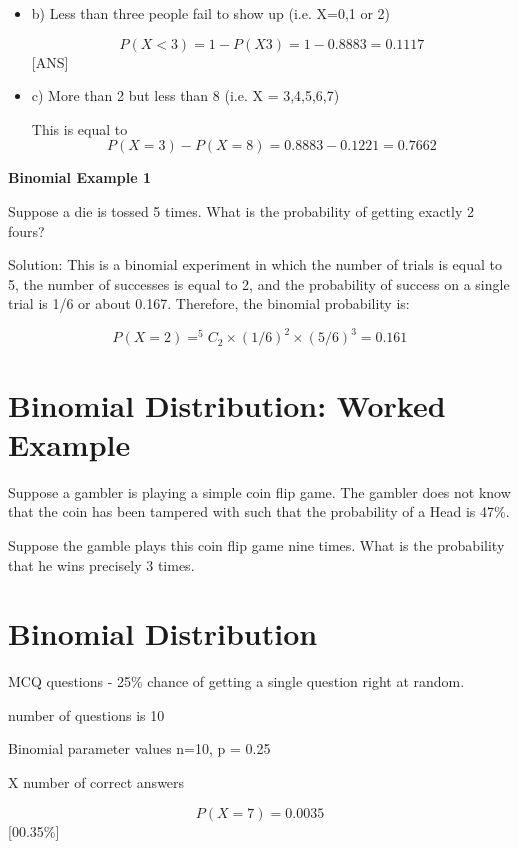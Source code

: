 \documentclass[]{report}
\begin{document}
{\begin{itemize}
\[P(X=6) =0.3839\]

\item b) Less than three people fail to show up (i.e. X=0,1 or 2)

\[P(X < 3) = 1- P(X3) =    1 - 0.8883  = 0.1117\] [ANS]


\item c) More than 2 but less than 8   (i.e. X = 3,4,5,6,7)

This is equal to \[P(X=3) - P(X=8) = 0.8883 -0.1221 =  0.7662\]

\end{itemize}


\noindent \textbf{ Binomial Example 1}

Suppose a die is tossed 5 times. What is the probability of getting exactly 2 fours?

Solution: This is a binomial experiment in which the number of trials is equal to 5, the number of successes is equal to 2, and the probability of success on a single trial is 1/6 or about 0.167. Therefore, the binomial probability is:

\[P(X=2) = ^5C_2 \times (1/6)^2 \times (5/6)^3 = 0.161\]



\section{Binomial Distribution: Worked Example}
Suppose a gambler is playing a simple coin flip game. 
The gambler does not know that the coin has been tampered with such that the probability of a Head is 47\%.

Suppose the gamble plays this coin flip game nine times. 
What is the probability that he wins precisely 3 times.





\section{Binomial Distribution}

MCQ questions  - 25\% chance of getting a single question right at random.

number of questions is 10

Binomial parameter values n=10, p = 0.25

X number of correct answers


\[P(X=7) = 0.0035 \]       [00.35\%]



}
\end{document}
